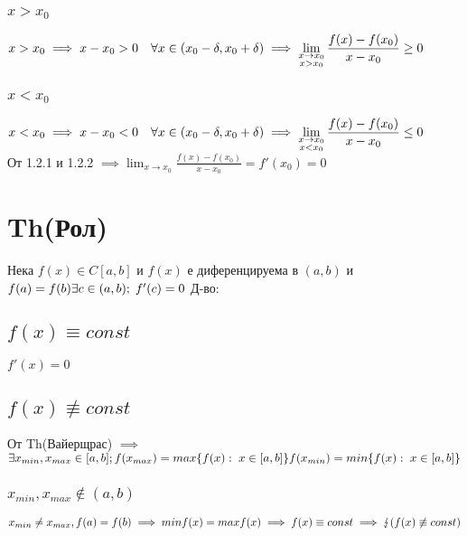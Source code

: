 \documentclass{article}
\newcommand{\spc}[0]{\quad}
\newcommand{\cntrdcn}[0]{\lightning}
\begin{document}
    \subsubsection{\(x > x_0\)}
    \(x > x_0 \implies x - x_0 > 0 \spc \forall x \in (x_0 - \delta, x_0 + \delta)\\
    \implies \displaystyle\lim\limits_{\substack{x \to x_0 \\ x > x_0}} \frac{f(x) - f(x_0)}{x - x_0} \geq 0\)

    \subsubsection{\(x < x_0\)}
    \(x < x_0 \implies x - x_0 < 0 \spc \forall x \in (x_0 - \delta, x_0 + \delta)\\
    \implies \displaystyle\lim\limits_{\substack{x \to x_0 \\ x < x_0}} \frac{f(x) - f(x_0)}{x - x_0} \leq 0\)\\
    От 1.2.1 и 1.2.2 \(\implies \displaystyle\lim_{x \to x_0} \frac{f(x) - f(x_0)}{x - x_0} = f'(x_0) = 0\)

    \section{Th(Рол)}
    Нека \(f(x) \in C[a, b]\) и \(f(x)\) е диференцируема в \((a, b)\) и \(f(a) = f(b)\\
    \exists c \in (a, b); \; f'(c) = 0\)
    \bigbreak
    Д-во:

    \subsection{\(f(x) \equiv const\)}
    \(f'(x) = 0\)

    \subsection{\(f(x) \not\equiv const\)}
    От Th(Вайерщрас) \(\implies\)\\
    \(\exists x_{min}, x_{max} \in [a, b];\\
    f(x_{max}) = max\{f(x) : \; x \in [a, b]\}\\
    f(x_{min}) = min\{f(x) : \; x \in [a, b]\}\)

    \subsubsection{\(x_{min}, x_{max} \notin (a, b)\)}
    \(x_{min} \neq x_{max}, f(a) = f(b) \implies minf(x) = maxf(x)\\
    \implies f(x) \equiv const \implies \cntrdcn (f(x) \not\equiv const)\)
\end{document}
